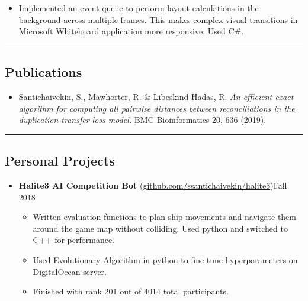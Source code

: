\documentclass[10pt,letterpaper]{article}
\begin{document}
\begin{itemize}
    \begin{itemize}[label=\textbullet]
      \itemsep0.1em
      \item Implemented an event queue to perform layout calculations in the background 
      across multiple frames. This makes complex visual transitions in Microsoft Whiteboard application
      more responsive. Used C\#.
    \end{itemize}


  \end{itemize}

\hrule
\vspace{-0.95em}
\subsection*{Publications}
\begin{itemize}
  \parskip=-0.45em
  \item[]
  Santichaivekin, S., Mawhorter, R. \& Libeskind-Hadas, R. \textit{An efficient exact algorithm for computing all pairwise distances between reconciliations in the duplication-transfer-loss model.} \href{https://doi.org/10.1186/s12859-019-3203-9}{BMC Bioinformatics 20, 636 (2019)}.
\end{itemize}

  
\hrule
\vspace{-0.95em}
\subsection*{Personal Projects}
  \begin{itemize}
    \parskip=-0.45em
    \item[]
    {\textbf{Halite3 AI Competition Bot} (\href{https://github.com/ssantichaivekin/halite3}
    {github.com/ssantichaivekin/halite3})\hfill {Fall 2018}}
    \begin{itemize}[label=\textbullet]
        \item  Written evaluation functions to plan ship movements and navigate them around the game map without colliding.
        Used python and switched to C++ for performance.
        \item Used Evolutionary Algorithm in python to fine-tune hyperparameters on DigitalOcean server.
        \item Finished with rank 201 out of 4014 total participants.
    \end{itemize}
  \end{itemize}
\end{document}
